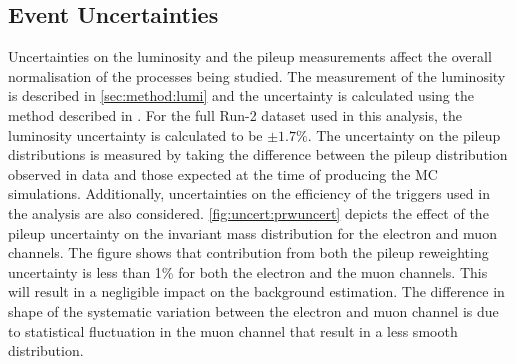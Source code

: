 \subsection{Event Uncertainties}
Uncertainties on the luminosity and the pileup measurements affect the overall normalisation of the processes being studied. The measurement of the luminosity is described in \cref{sec:method:lumi} and the uncertainty is calculated using the method described in \cite{Aaboud:2208146}. For the full Run-2 dataset used in this analysis, the luminosity uncertainty is calculated to be $\pm 1.7\%$. The uncertainty on the pileup distributions is measured by taking the difference between the pileup distribution observed in data and those expected at the time of producing the MC simulations. Additionally, uncertainties on the efficiency of the triggers used in the analysis are also considered.  \cref{fig:uncert:prwuncert} depicts the effect of the pileup uncertainty on the invariant mass distribution for the electron and muon channels. The figure shows that contribution from both the pileup reweighting uncertainty is less than 1\% for both the electron and the muon channels. This will result in a negligible impact on the background estimation. The difference in shape of the systematic variation between the electron and muon channel is due to statistical fluctuation in the muon channel that result in a less smooth distribution. 

